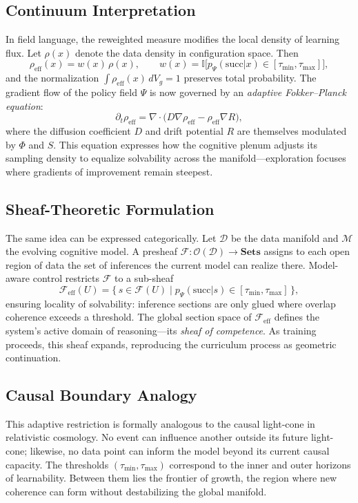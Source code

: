 \documentclass[11pt]{article}
\begin{document}
\subsection{Continuum Interpretation}

In field language, the reweighted measure modifies the local density of learning flux.  
Let $\rho(x)$ denote the data density in configuration space.  
Then
\[
\rho_{\mathrm{eff}}(x)
=
w(x)\,\rho(x),
\qquad
w(x)=
\mathbb{I}\!\big[p_\Psi(\mathrm{succ}|x)\!\in\![\tau_{\min},\tau_{\max}]\big],
\]
and the normalization
$\int \rho_{\mathrm{eff}}(x)\,dV_g=1$
preserves total probability.  
The gradient flow of the policy field $\Psi$ is now governed by an \emph{adaptive Fokker–Planck equation}:
\[
\partial_t \rho_{\mathrm{eff}}
= 
\nabla\!\cdot\!\Big(
D\nabla\rho_{\mathrm{eff}}
-
\rho_{\mathrm{eff}}\nabla R
\Big),
\]
where the diffusion coefficient $D$ and drift potential $R$ are themselves modulated by $\Phi$ and $S$.  
This equation expresses how the cognitive plenum adjusts its sampling density to equalize solvability across the manifold—exploration focuses where gradients of improvement remain steepest.

\subsection{Sheaf-Theoretic Formulation}

The same idea can be expressed categorically.  
Let $\mathcal{D}$ be the data manifold and $\mathcal{M}$ the evolving cognitive model.  
A presheaf $\mathcal{F}:\mathcal{O}(\mathcal{D})\!\to\!\mathbf{Sets}$ assigns to each open region of data the set of inferences the current model can realize there.  
Model-aware control restricts $\mathcal{F}$ to a sub-sheaf
\[
\mathcal{F}_{\mathrm{eff}}(U)
=
\{\,s\!\in\!\mathcal{F}(U)
\mid p_\Psi(\mathrm{succ}|s)\!\in\![\tau_{\min},\tau_{\max}]\,\},
\]
ensuring locality of solvability: inference sections are only glued where overlap coherence exceeds a threshold.  
The global section space of $\mathcal{F}_{\mathrm{eff}}$ defines the system’s active domain of reasoning—its \emph{sheaf of competence}.  
As training proceeds, this sheaf expands, reproducing the curriculum process as geometric continuation.

\subsection{Causal Boundary Analogy}

This adaptive restriction is formally analogous to the causal light-cone in relativistic cosmology.  
No event can influence another outside its future light-cone;  
likewise, no data point can inform the model beyond its current causal capacity.  
The thresholds $(\tau_{\min},\tau_{\max})$ correspond to the inner and outer horizons of learnability.  
Between them lies the frontier of growth, the region where new coherence can form without destabilizing the global manifold.
\end{document}
